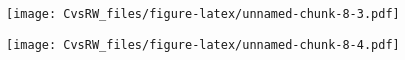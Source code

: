 \documentclass[
]{article}
\newenvironment{Shaded}{\begin{snugshade}}{\end{snugshade}}
\newcommand{\DataTypeTok}[1]{\textcolor[rgb]{0.13,0.29,0.53}{#1}}
\newcommand{\FloatTok}[1]{\textcolor[rgb]{0.00,0.00,0.81}{#1}}
\newcommand{\KeywordTok}[1]{\textcolor[rgb]{0.13,0.29,0.53}{\textbf{#1}}}
\newcommand{\NormalTok}[1]{#1}
\newcommand{\OperatorTok}[1]{\textcolor[rgb]{0.81,0.36,0.00}{\textbf{#1}}}
\newcommand{\StringTok}[1]{\textcolor[rgb]{0.31,0.60,0.02}{#1}}
\begin{document}
\texttt{[image: CvsRW\_files/figure-latex/unnamed-chunk-8-3.pdf]}

\begin{Shaded}
\end{Shaded}

\texttt{[image: CvsRW\_files/figure-latex/unnamed-chunk-8-4.pdf]}

\begin{Shaded}
\end{Shaded}
\end{document}
